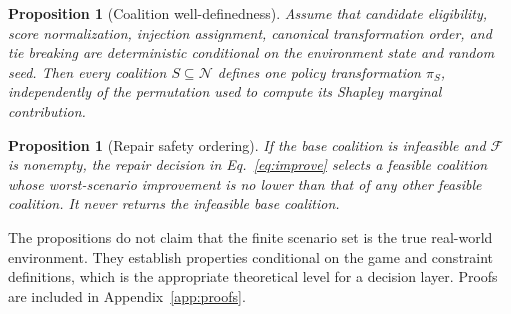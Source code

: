\documentclass[pdflatex,sn-mathphys-num]{sn-jnl}
\theoremstyle{thmstyleone}
\newtheorem{proposition}[theorem]{Proposition}
\theoremstyle{thmstyletwo}
\theoremstyle{thmstylethree}
\newcommand{\Players}{\mathcal{N}}
\newcommand{\Policy}{\pi}
\begin{document}
\begin{proposition}[Coalition well-definedness]\label{prop:well-defined}
Assume that candidate eligibility, score normalization, injection assignment, canonical transformation order, and tie breaking are deterministic conditional on the environment state and random seed. Then every coalition $S\subseteq\Players$ defines one policy transformation $\Policy_S$, independently of the permutation used to compute its Shapley marginal contribution.
\end{proposition}

\begin{proposition}[Repair safety ordering]\label{prop:repair}
If the base coalition is infeasible and $\mathcal{F}$ is nonempty, the repair decision in Eq.~\eqref{eq:improve} selects a feasible coalition whose worst-scenario improvement is no lower than that of any other feasible coalition. It never returns the infeasible base coalition.
\end{proposition}

The propositions do not claim that the finite scenario set is the true real-world environment. They establish properties conditional on the game and constraint definitions, which is the appropriate theoretical level for a decision layer. Proofs are included in Appendix~\ref{app:proofs}.
\end{document}
